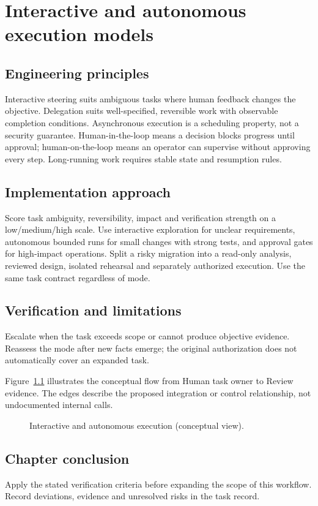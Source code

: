 \chapter{Interactive and autonomous execution models}

\section{Engineering principles}

Interactive steering suits ambiguous tasks where human feedback changes the objective. Delegation suits well-specified, reversible work with observable completion conditions. Asynchronous execution is a scheduling property, not a security guarantee. Human-in-the-loop means a decision blocks progress until approval; human-on-the-loop means an operator can supervise without approving every step. Long-running work requires stable state and resumption rules.

\section{Implementation approach}

Score task ambiguity, reversibility, impact and verification strength on a low/medium/high scale. Use interactive exploration for unclear requirements, autonomous bounded runs for small changes with strong tests, and approval gates for high-impact operations. Split a risky migration into a read-only analysis, reviewed design, isolated rehearsal and separately authorized execution. Use the same task contract regardless of mode.

\section{Verification and limitations}

Escalate when the task exceeds scope or cannot produce objective evidence. Reassess the mode after new facts emerge; the original authorization does not automatically cover an expanded task.

Figure~\ref{fig:d10} illustrates the conceptual flow from Human task owner to Review evidence. The edges describe the proposed integration or control relationship, not undocumented internal calls.

\begin{figure}[htbp]\centering\caption{Interactive and autonomous execution (conceptual view).}\label{fig:d10}\end{figure}

\section{Chapter conclusion}

Apply the stated verification criteria before expanding the scope of this workflow. Record deviations, evidence and unresolved risks in the task record.
